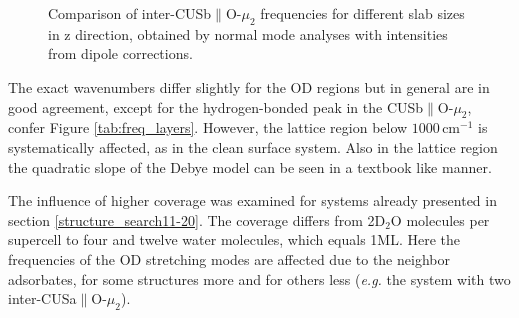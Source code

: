 \documentclass[11pt,DIV=13,BCOR=5mm,a4paper,headinclude]{scrbook}
\newcommand\todo[1]{\textcolor{red}{TODO: \textit{{#1}}}}
\begin{document}
\begin{figure}[!h]
    \centering
             \quad
             \quad
             \caption{Comparison of inter-CUSb$\parallel$O-$\mu_2$ frequencies for different slab sizes in z direction, obtained by normal mode analyses with intensities from dipole corrections.}
            \label{abb:iCb2_size_comp}
\end{figure}
The exact wavenumbers differ slightly for the OD regions but in general are in good agreement, except for the hydrogen-bonded peak in the CUSb$\parallel$O-$\mu_2$, confer Figure \ref{tab:freq_layers}.
However, the lattice region below $1000\,$cm$^{-1}$ is systematically affected, as in the clean surface system.
Also in the lattice region the quadratic slope of the Debye model can be seen in a textbook like manner.


The influence of higher coverage was examined for systems already presented in section \ref{structure_search11-20}.
The coverage differs from 2D$_2$O molecules per supercell to four and twelve water molecules, which equals 1ML.
Here the frequencies of the OD stretching modes are affected due to the neighbor adsorbates, for some structures more and for others less (\textit{e.g.} the system with two inter-CUSa$\parallel$O-$\mu_2$).
\end{document}
